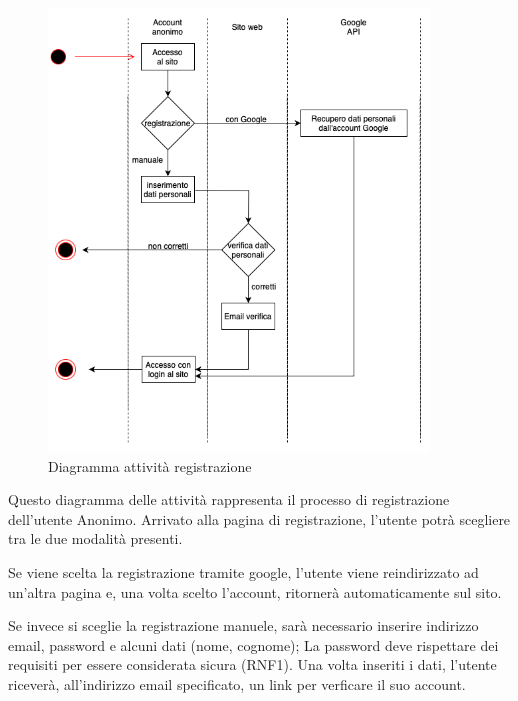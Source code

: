\documentclass[a4paper,12pt]{article}
\begin{document}
\begin{figure}[H]
   \centering
    \includegraphics[width=0.90\textwidth]{img/diagramma_registrazione.png}
    \caption{Diagramma attività registrazione}
\end{figure}

Questo diagramma delle attività rappresenta il processo di registrazione dell'utente Anonimo. 
Arrivato alla pagina di registrazione, l'utente potrà scegliere tra le due modalità presenti.

Se viene scelta la registrazione tramite google, l'utente viene reindirizzato ad un'altra pagina e, una volta scelto l'account, ritornerà automaticamente sul sito.

Se invece si sceglie la registrazione manuele, sarà necessario inserire indirizzo email, password e alcuni dati (nome, cognome); La password deve rispettare dei requisiti per essere considerata sicura (RNF1).
Una volta inseriti i dati, l'utente riceverà, all'indirizzo email specificato, un link per verficare il suo account. 
\end{document}
